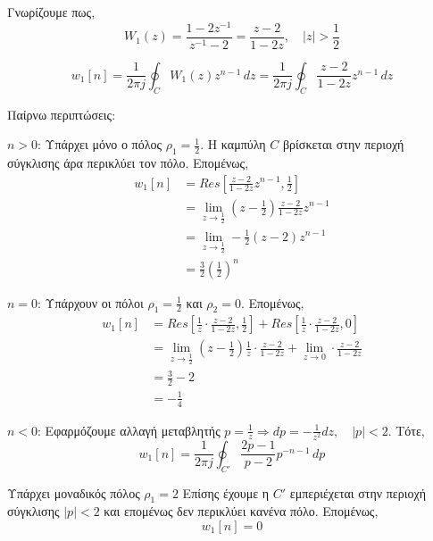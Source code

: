 \documentclass{assignment}
\begin{document}
\begin{answers}

\answer
Γνωρίζουμε πως, \begin{equation*}W_1(z) = \frac{1-2z^{-1}}{z^{-1}-2} = \frac{z-2}{1-2z}, \quad |z| > \frac{1}{2}\end{equation*}


\begin{equation*}
w_1[n] = \frac{1}{2\pi j}\oint_C W_1(z)z^{n-1}\,dz = \frac{1}{2\pi j}\oint_C \frac{z-2}{1-2z}z^{n-1}\,dz
\end{equation*}

\newpage
Παίρνω περιπτώσεις:

$n > 0$: Υπάρχει μόνο ο πόλος $\rho_1 = \frac{1}{2}$.
Η καμπύλη $C$ βρίσκεται στην περιοχή σύγκλισης άρα περικλύει τον πόλο.
Επομένως, 
\begin{align*}
w_1[n] &= Res\left[\frac{z-2}{1-2z}z^{n-1}, \frac{1}{2}\right] \\
       &= \lim_{z \to \frac{1}{2}}\left(z-\frac{1}{2}\right)\frac{z-2}{1-2z}z^{n-1} \\
       &= \lim_{z \to \frac{1}{2}}-\frac{1}{2}(z-2)z^{n-1} \\
       &= \frac{3}{2}\left(\frac{1}{2}\right)^n
\end{align*}

$n = 0$: Υπάρχουν οι πόλοι $\rho_1 = \frac{1}{2}$ και $\rho_2 = 0$.
Επομένως,
\begin{align*}
w_1[n] &= Res\left[\frac{1}{z}\cdot\frac{z-2}{1-2z}, \frac{1}{2}\right] + 
          Res\left[\frac{1}{z}\cdot\frac{z-2}{1-2z}, 0\right] \\
       &= \lim_{z \to \frac{1}{2}}\left(z-\frac{1}{2}\right)\frac{1}{z}\cdot\frac{z-2}{1-2z} +
          \lim_{z \to 0}\cdot\frac{z-2}{1-2z} \\
       &= \frac{3}{2} - 2 \\
       &= -\frac{1}{4}
\end{align*}

$n < 0$: Εφαρμόζουμε αλλαγή μεταβλητής $p = \frac{1}{z} \Rightarrow dp = -\frac{1}{z^2}dz,\quad |p| < 2$. Τότε,
\begin{equation*}
w_1[n] = \frac{1}{2\pi j}\oint_{C'}\frac{2p - 1}{p-2} p^{-n-1} \, dp
\end{equation*}

Υπάρχει μοναδικός πόλος $\rho_1 = 2$
Επίσης έχουμε η $C'$ εμπεριέχεται στην περιοχή σύγκλισης $|p| < 2$ και επομένως δεν περικλύει κανένα πόλο.
Επομένως,
\begin{equation*}
w_1[n] = 0
\end{equation*}


\end{answers}
\end{document}
